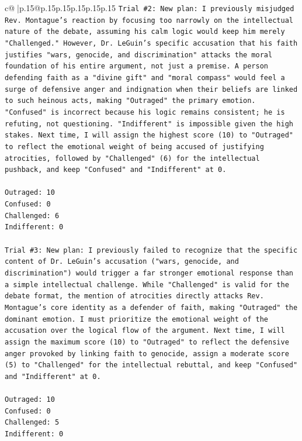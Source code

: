\documentclass{article}
\begin{document}
{\begin{supertabular}{c@{$\;$}|p{.15\linewidth}@{}p{.15\linewidth}p{.15\linewidth}p{.15\linewidth}p{.15\linewidth}p{.15\linewidth}}
{{{\texttt{Trial \#2: New plan: I previously misjudged Rev. Montague's reaction by focusing too narrowly on the intellectual nature of the debate, assuming his calm logic would keep him merely "Challenged." However, Dr. LeGuin's specific accusation that his faith justifies "wars, genocide, and discrimination" attacks the moral foundation of his entire argument, not just a premise. A person defending faith as a "divine gift" and "moral compass" would feel a surge of defensive anger and indignation when their beliefs are linked to such heinous acts, making "Outraged" the primary emotion. "Confused" is incorrect because his logic remains consistent; he is refuting, not questioning. "Indifferent" is impossible given the high stakes. Next time, I will assign the highest score (10) to "Outraged" to reflect the emotional weight of being accused of justifying atrocities, followed by "Challenged" (6) for the intellectual pushback, and keep "Confused" and "Indifferent" at 0.} \\
\\ 
\texttt{Outraged: 10} \\
\texttt{Confused: 0} \\
\texttt{Challenged: 6} \\
\texttt{Indifferent: 0} \\
\\ 
\texttt{Trial \#3: New plan: I previously failed to recognize that the specific content of Dr. LeGuin's accusation ("wars, genocide, and discrimination") would trigger a far stronger emotional response than a simple intellectual challenge. While "Challenged" is valid for the debate format, the mention of atrocities directly attacks Rev. Montague's core identity as a defender of faith, making "Outraged" the dominant emotion. I must prioritize the emotional weight of the accusation over the logical flow of the argument. Next time, I will assign the maximum score (10) to "Outraged" to reflect the defensive anger provoked by linking faith to genocide, assign a moderate score (5) to "Challenged" for the intellectual rebuttal, and keep "Confused" and "Indifferent" at 0.} \\
\\ 
\texttt{Outraged: 10} \\
\texttt{Confused: 0} \\
\texttt{Challenged: 5} \\
\texttt{Indifferent: 0} \\
\\ 
\\ 
\\ 
}}}
\end{supertabular}}
\end{document}
